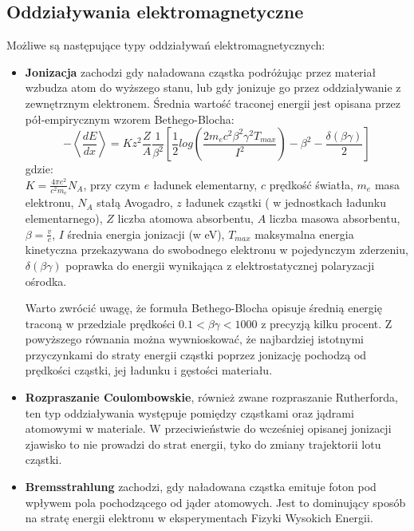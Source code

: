 \subsection{Oddziaływania elektromagnetyczne}
Możliwe są następujące typy oddziaływań elektromagnetycznych:
\begin{itemize}
\item \textbf{Jonizacja} zachodzi gdy naładowana cząstka podróżując przez materiał wzbudza atom do wyższego stanu, lub gdy jonizuje go przez oddziaływanie z zewnętrznym elektronem. Średnia wartość traconej energii jest opisana przez pół-empirycznym wzorem Bethego-Blocha: 
\begin{equation}
-\left< \frac{dE}{dx} \right> = Kz^2\frac{Z}{A}\frac{1}{\beta^2}\left[\frac{1}{2}log\left(\frac{2m_ec^2\beta^2\gamma^2T_{max}}{I^2}\right) -\beta^2-\frac{\delta(\beta\gamma)}{2} \right]
\label{bethe}
\end{equation}
gdzie: \\
$K=\frac{4\pi e^2}{c^2m_e}N_A$, przy czym $e$ ładunek elementarny, $c$ prędkość światła, $m_e$ masa elektronu, $N_A$ stałą Avogadro, $z$ ładunek cząstki ( w jednostkach ładunku elementarnego), $Z$ liczba atomowa absorbentu, $A$ liczba masowa absorbentu, $\beta=\frac{v}{c}$, $I$ średnia energia jonizacji (w eV), $T_{max}$ maksymalna energia kinetyczna przekazywana do swobodnego elektronu w pojedynczym zderzeniu, $\delta(\beta\gamma)$ poprawka do energii wynikająca z elektrostatycznej polaryzacji ośrodka.

Warto zwrócić uwagę, że formuła Bethego-Blocha opisuje średnią energię traconą w przedziale prędkości $0.1<\beta\gamma<1000$ z precyzją kilku procent. Z powyższego równania można wywnioskować, że najbardziej istotnymi przyczynkami do straty energii cząstki poprzez jonizację pochodzą od prędkości cząstki, jej ładunku i gęstości materiału.

\item \textbf{Rozpraszanie Coulombowskie}, również zwane rozpraszanie Rutherforda, ten typ oddziaływania występuje pomiędzy cząstkami oraz jądrami atomowymi w materiale. W przeciwieństwie do wcześniej opisanej jonizacji zjawisko to nie prowadzi do strat energii, tyko do zmiany trajektorii lotu cząstki. 

\item \textbf{Bremsstrahlung} zachodzi, gdy naładowana cząstka emituje foton pod wpływem pola pochodzącego od jąder atomowych. Jest to dominujący sposób na stratę energii elektronu w eksperymentach Fizyki Wysokich Energii.


\end{itemize}
